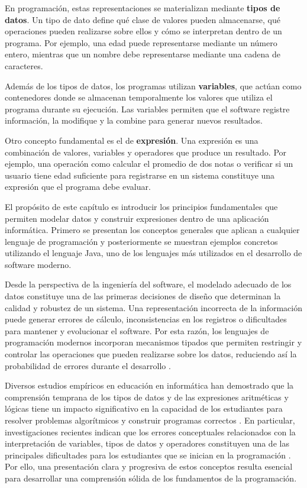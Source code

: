 \documentclass[12pt,twoside]{book}
\begin{document}
			En programación, estas representaciones se materializan mediante \textbf{tipos de datos}. Un tipo de dato define qué clase de valores pueden almacenarse, qué operaciones pueden realizarse sobre ellos y cómo se interpretan dentro de un programa. Por ejemplo, una edad puede representarse mediante un número entero, mientras que un nombre debe representarse mediante una cadena de caracteres.
			
			Además de los tipos de datos, los programas utilizan \textbf{variables}, que actúan como contenedores donde se almacenan temporalmente los valores que utiliza el programa durante su ejecución. Las variables permiten que el software registre información, la modifique y la combine para generar nuevos resultados.
			
			Otro concepto fundamental es el de \textbf{expresión}. Una expresión es una combinación de valores, variables y operadores que produce un resultado. Por ejemplo, una operación como calcular el promedio de dos notas o verificar si un usuario tiene edad suficiente para registrarse en un sistema constituye una expresión que el programa debe evaluar.
			
			El propósito de este capítulo es introducir los principios fundamentales que permiten modelar datos y construir expresiones dentro de una aplicación informática. Primero se presentan los conceptos generales que aplican a cualquier lenguaje de programación y posteriormente se muestran ejemplos concretos utilizando el lenguaje Java, uno de los lenguajes más utilizados en el desarrollo de software moderno.
			
			Desde la perspectiva de la ingeniería del software, el modelado adecuado de los datos constituye una de las primeras decisiones de diseño que determinan la calidad y robustez de un sistema. Una representación incorrecta de la información puede generar errores de cálculo, inconsistencias en los registros o dificultades para mantener y evolucionar el software. Por esta razón, los lenguajes de programación modernos incorporan mecanismos tipados que permiten restringir y controlar las operaciones que pueden realizarse sobre los datos, reduciendo así la probabilidad de errores durante el desarrollo \cite{Pierce2002Types,Sebesta2018Concepts}.
			
			Diversos estudios empíricos en educación en informática han demostrado que la comprensión temprana de los tipos de datos y de las expresiones aritméticas y lógicas tiene un impacto significativo en la capacidad de los estudiantes para resolver problemas algorítmicos y construir programas correctos \cite{Lister2004Learning,Robins2003Learning}. En particular, investigaciones recientes indican que los errores conceptuales relacionados con la interpretación de variables, tipos de datos y operadores constituyen una de las principales dificultades para los estudiantes que se inician en la programación \cite{Qian2018Students}. Por ello, una presentación clara y progresiva de estos conceptos resulta esencial para desarrollar una comprensión sólida de los fundamentos de la programación.
			
\end{document}
